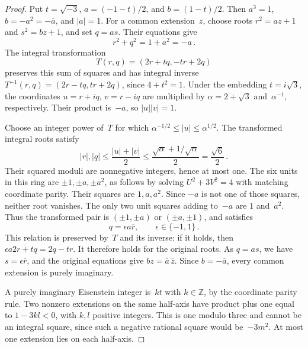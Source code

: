 \documentclass[12pt]{article}
\numberwithin{equation}{section}
\begin{document}
\begin{proof}
Put $t=\sqrt{-3}$, $a=(-1-t)/2$, and $b=(1-t)/2$. Then $a^3=1$, $b=-a^2=-\overline a$, and $|a|=1$. For a common extension~$z$, choose roots $r^2=az+1$ and $s^2=bz+1$, and set $q=as$. Their equations give
\begin{equation*}
 r^2+q^2=1+a^2=-a\,.
\end{equation*}
The integral transformation
\begin{equation*}
 T(r,q)=(2r+tq,-tr+2q)
\end{equation*}
preserves this sum of squares and has integral inverse $T^{-1}(r,q)=(2r-tq,tr+2q)$, since $4+t^2=1$. Under the embedding $t=i\sqrt3$, the coordinates $u=r+iq$, $v=r-iq$ are multiplied by $\alpha=2+\sqrt3$ and~$\alpha^{-1}$, respectively. Their product is~$-a$, so $|u||v|=1$.

Choose an integer power of~$T$ for which $\alpha^{-1/2}\le|u|\le\alpha^{1/2}$. The transformed integral roots satisfy
\begin{equation*}
 |r|,|q|\le\frac{|u|+|v|}{2}
 \le\frac{\sqrt\alpha+1/\sqrt\alpha}{2}=\frac{\sqrt6}{2}\,.
\end{equation*}
Their squared moduli are nonnegative integers, hence at most one. The six units in this ring are $\pm1,\pm a,\pm a^2$, as follows by solving $U^2+3V^2=4$ with matching coordinate parity. Their squares are $1,a,a^2$. Since $-a$ is not one of those squares, neither root vanishes. The only two unit squares adding to~$-a$ are $1$ and~$a^2$. Thus the transformed pair is $(\pm1,\pm a)$ or $(\pm a,\pm1)$, and satisfies
\begin{equation*}
 q=\epsilon a\overline r,\qquad\epsilon\in\{-1,1\}\,.
\end{equation*}
This relation is preserved by~$T$ and its inverse: if it holds, then $\epsilon a\overline{2r+tq}=2q-tr$. It therefore holds for the original roots. As $q=as$, we have $s=\epsilon\overline r$, and the original equations give $bz=\overline a\,\overline z$. Since $b=-\overline a$, every common extension is purely imaginary.

A purely imaginary Eisenstein integer is~$kt$ with $k\in\mathbb Z$, by the coordinate parity rule. Two nonzero extensions on the same half-axis have product plus one equal to $1-3kl<0$, with $k,l$ positive integers. This is one modulo three and cannot be an integral square, since such a negative rational square would be~$-3m^2$. At most one extension lies on each half-axis.
\end{proof}
\end{document}
